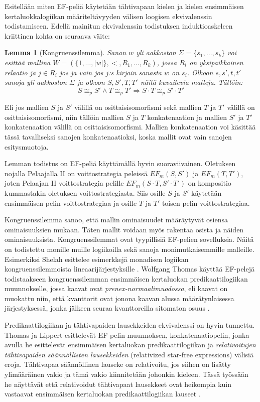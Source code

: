 \documentclass[finnish]{tktltiki2}
\newtheorem{lem}[lau]{Lemma}
\theoremstyle{definition}
\theoremstyle{remark}
\begin{document}
Esitellään miten EF-peliä käytetään tähtivapaan kielen ja kielen ensimmäisen kertaluokkalogiikan määriteltävyyden välisen loogisen ekvivalenssin todistamiseen. Edellä mainitun ekvivalenssin todistuksen induktioaskeleen kriittinen kohta on seuraava väite:

\begin{lem}[Kongruenssilemma]
Sanan $w$ yli aakkoston $\Sigma = \{s_1, \ldots, s_k\}$ voi esittää mallina $W = (\{1, \ldots, |w|\}, <, R_1, \ldots, R_k)$, jossa $R_i$ on yksipaikkainen relaatio ja $j \in R_i$ jos ja vain jos $j$:s kirjain sanasta $w$ on $s_i$. Olkoon $s, s', t, t'$ sanoja yli aakkoston $\Sigma$ ja olkoon $S, S', T , T'$ näitä kuvailevia malleja. Tällöin: \[ S \cong_p S' \land T \cong_p T' \Longrightarrow S \cdot T \cong_p S' \cdot T' \]
\end{lem}
Eli jos mallien $S$ ja $S'$ välillä on osittaisisomorfismi sekä mallien $T$ ja $T'$ välillä on osittaisisomorfismi, niin tällöin mallien $S$ ja $T$ konkatenaation ja mallien $S'$ ja $T'$ konkatenaation välillä on osittaisisomorfismi. Mallien konkatenaation voi käsittää tässä tavalliseksi sanojen konkatenaatioksi, koska mallit ovat vain sanojen esitysmuotoja.

Lemman todistus on EF-peliä käyttämällä hyvin suoraviivainen. Oletuksen nojalla Pelaajalla II on voittostrategia peleissä $EF_m(S, S')$ ja $EF_m(T, T')$, joten Pelaajan II voittostrategia pelille $EF_m(S \cdot T, S' \cdot T')$ on kompositio kummastakin oletuksen voittostrategiasta. Siis osille $S$ ja $S'$ käytetään ensimmäisen pelin voittostrategiaa ja osille $T$ ja $T'$ toisen pelin voittostrategiaa.

Kongruenssilemma sanoo, että mallin ominaisuudet määräytyvät osiensa ominaisuuksien mukaan. Täten mallit voidaan myös rakentaa osista ja näiden ominaisuuksista. Kongruenssilemmat ovat tyypillisiä EF-pelien sovelluksia. Näitä on todistettu monille muille logiikoilla sekä sanoja monimutkaisemmille malleille. Esimerkiksi Shelah esittelee esimerkkejä monadisen logiikan kongruenssilemmoista lineaarijärjestyksille \cite{She75}. Wolfgang Thomas käyttää EF-pelejä todistaakseen kongruenssilemman ensimmäisen kertaluokan predikaattilogiikan muunnokselle, jossa kaavat ovat \textit{prenex-normaalimuodossa}, eli kaavat on muokattu niin, että kvanttorit ovat jonona kaavan alussa määrätynlaisessa järjestyksessä, jonka jälkeen seuraa kvanttoreilla sitomaton osuus \cite{Tho84}.

Predikaattilogiikan ja tähtivapaiden lausekkeiden ekvivalenssi on hyvin tunnettu. Thomas ja Lippert esittelevät EF-pelin muunnoksen, konkatenaatiopelin, jonka avulla he esittelevät ensimmäisen kertaluokan predikaattilogiikan ja \textit{relativoitujen tähtivapaiden säännöllisten lausekkeiden} (relativized star-free expressions) välisiä eroja. Tähtivapaa säännöllinen lauseke on relativoitu, jos siihen on lisätty ylimääräinen vakio ja tämä vakio kiinnitetään johonkin kieleen. Tässä työssään he näyttävät että relativoidut tähtivapaat lausekkeet ovat heikompia kuin vastaavat ensimmäisen kertaluokan predikaattilogiikan lauseet \cite{Lip88}.
\end{document}
